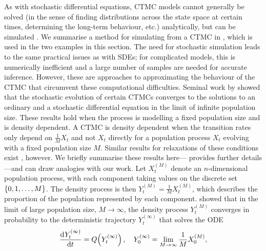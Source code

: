 As with stochastic differential equations, CTMC models cannot generally be solved (in the sense of finding distributions across the state space at certain times, determining the long-term behaviour, etc.) analytically, but can be simulated \citep{Gillespie_1977_ExactStochasticSimulation}.
We summarise a method for simulating from a CTMC in , which is used in the two examples in this section.
The need for stochastic simulation leads to the same practical issues as with SDEs; for complicated models, this is numerically inefficient and a large number of samples are needed for accurate inference.
However, these are approaches to approximating the behaviour of the CTMC that circumvent these computational difficulties.
Seminal work by \citet{Kurtz_1970_SolutionsOrdinaryDifferential,Kurtz_1971_LimitTheoremsSequences} showed that the stochastic evolution of certain CTMCs converges to the solutions to an ordinary and a stochastic differential equation in the limit of infinite population size.
These results hold when the process is modelling a fixed population size and is density dependent.
A CTMC is density dependent when the transition rates only depend on \(\frac1M X_t\) and not \(X_t\) directly for a population process \(X_t\) evolving with a fixed population size \(M\).
Similar results for relaxations of these conditions exist \citep{Pollett_1990_ModelInterferenceSearching}, however.
We briefly summarise these results here--- provides further details---and can draw analogies with our work.
Let \(X_t^{(M)}\) denote an \(n\)-dimensional population process, with each component taking values on the discrete set \(\set{0, 1, \dotsc, M}\).
The density process is then \(Y_t^{(M)} = \frac1M X_t^{(M)}\), which describes the proportion of the population represented by each component.
\citet{Kurtz_1970_SolutionsOrdinaryDifferential} showed that in the limit of large population size, \(M \to \infty\), the density process \(Y_t^{(M)}\) converges in probability to the deterministic trajectory \(Y_t^{(\infty)}\) that solves the ODE \citep{Kurtz_1970_SolutionsOrdinaryDifferential}
\begin{equation}\label{eqn:ctmc_ode}
	\dod{Y_t^{(\infty)}}{t} = Q\!\left(Y_t^{(\infty)}\right), \quad Y_0^{(\infty)} = \lim_{M\to\infty}\frac1M X^{(M)}_0,
\end{equation}
